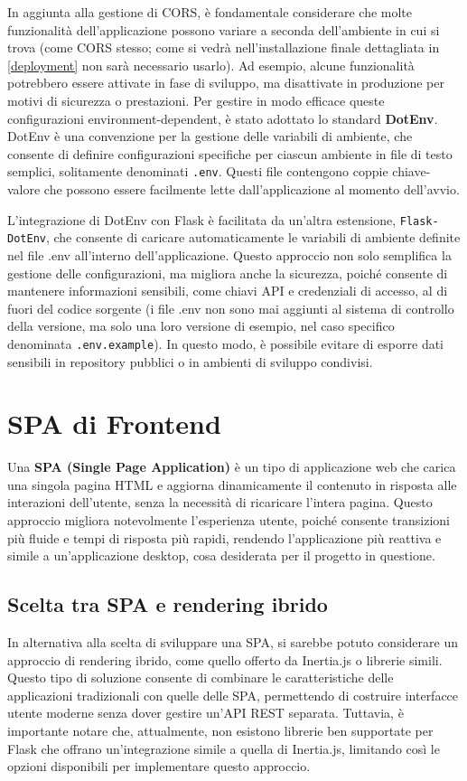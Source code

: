 In aggiunta alla gestione di CORS, è fondamentale considerare che molte funzionalità dell'applicazione possono variare a seconda dell'ambiente in cui si trova (come CORS stesso; come si vedrà nell'installazione finale dettagliata in \ref{deployment} non sarà necessario usarlo). Ad esempio, alcune funzionalità potrebbero essere attivate in fase di sviluppo, ma disattivate in produzione per motivi di sicurezza o prestazioni. Per gestire in modo efficace queste configurazioni environment-dependent, è stato adottato lo standard \textbf{DotEnv}. DotEnv è una convenzione per la gestione delle variabili di ambiente, che consente di definire configurazioni specifiche per ciascun ambiente in file di testo semplici, solitamente denominati \texttt{.env}. Questi file contengono coppie chiave-valore che possono essere facilmente lette dall'applicazione al momento dell'avvio.

L'integrazione di DotEnv con Flask è facilitata da un'altra estensione, \texttt{Flask-DotEnv}, che consente di caricare automaticamente le variabili di ambiente definite nel file .env all'interno dell'applicazione. Questo approccio non solo semplifica la gestione delle configurazioni, ma migliora anche la sicurezza, poiché consente di mantenere informazioni sensibili, come chiavi API e credenziali di accesso, al di fuori del codice sorgente (i file .env non sono mai aggiunti al sistema di controllo della versione, ma solo una loro versione di esempio, nel caso specifico denominata \texttt{.env.example}). In questo modo, è possibile evitare di esporre dati sensibili in repository pubblici o in ambienti di sviluppo condivisi.

\section{SPA di Frontend}
Una \textbf{SPA (Single Page Application)} è un tipo di applicazione web che carica una singola pagina HTML e aggiorna dinamicamente il contenuto in risposta alle interazioni dell'utente, senza la necessità di ricaricare l'intera pagina. Questo approccio migliora notevolmente l'esperienza utente, poiché consente transizioni più fluide e tempi di risposta più rapidi, rendendo l'applicazione più reattiva e simile a un'applicazione desktop, cosa desiderata per il progetto in questione.

\subsection{Scelta tra SPA e rendering ibrido}
In alternativa alla scelta di sviluppare una SPA, si sarebbe potuto considerare un approccio di rendering ibrido, come quello offerto da Inertia.js o librerie simili. Questo tipo di soluzione consente di combinare le caratteristiche delle applicazioni tradizionali con quelle delle SPA, permettendo di costruire interfacce utente moderne senza dover gestire un'API REST separata. Tuttavia, è importante notare che, attualmente, non esistono librerie ben supportate per Flask che offrano un'integrazione simile a quella di Inertia.js, limitando così le opzioni disponibili per implementare questo approccio.

